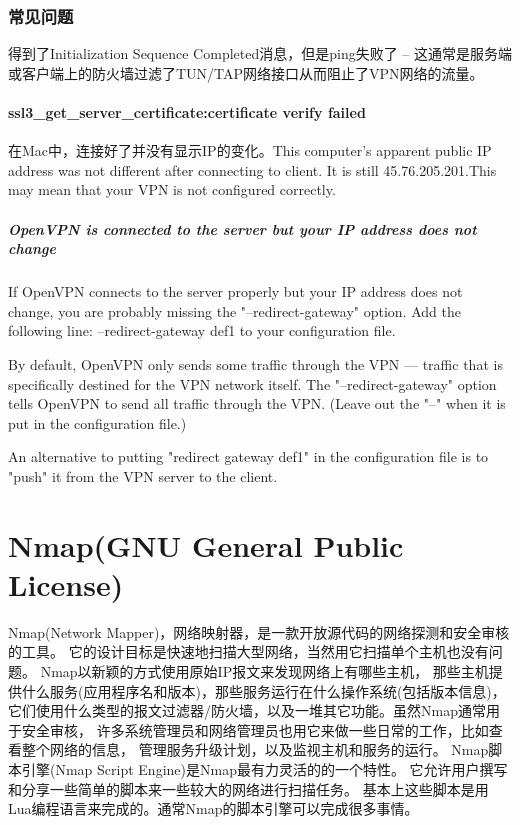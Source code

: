 \documentclass[letter]{book}
\begin{document}
\subsection{常见问题}

得到了Initialization Sequence Completed消息，但是ping失败了 -- 这通常是服务端或客户端上的防火墙过滤了TUN/TAP网络接口从而阻止了VPN网络的流量。  

\subsubsection{ssl3\_get\_server\_certificate:certificate verify failed}

在Mac中，连接好了并没有显示IP的变化。This computer's apparent public IP address was not different after connecting to client. It is still 45.76.205.201.This may mean that your VPN is not configured correctly.


\paragraph{OpenVPN is connected to the server but your IP address does not change}

If OpenVPN connects to the server properly but your IP address does not change, you are probably missing the "--redirect-gateway" option. Add the following line:
--redirect-gateway def1 to your configuration file.

By default, OpenVPN only sends some traffic through the VPN — traffic that is specifically destined for the VPN network itself. The "--redirect-gateway" option tells OpenVPN to send all traffic through the VPN. (Leave out the "--" when it is put in the configuration file.)

An alternative to putting "redirect gateway def1" in the configuration file is to "push" it from the VPN server to the client.

\chapter{Nmap(GNU General Public License)}

Nmap(Network Mapper)，网络映射器，是一款开放源代码的网络探测和安全审核的工具。
它的设计目标是快速地扫描大型网络，当然用它扫描单个主机也没有问题。
Nmap以新颖的方式使用原始IP报文来发现网络上有哪些主机，
那些主机提供什么服务(应用程序名和版本)，那些服务运行在什么操作系统(包括版本信息)，
它们使用什么类型的报文过滤器/防火墙，以及一堆其它功能。虽然Nmap通常用于安全审核，
许多系统管理员和网络管理员也用它来做一些日常的工作，比如查看整个网络的信息，
管理服务升级计划，以及监视主机和服务的运行。
Nmap脚本引擎(Nmap Script Engine)是Nmap最有力灵活的的一个特性。
它允许用户撰写和分享一些简单的脚本来一些较大的网络进行扫描任务。
基本上这些脚本是用Lua编程语言来完成的。通常Nmap的脚本引擎可以完成很多事情。
\end{document}
